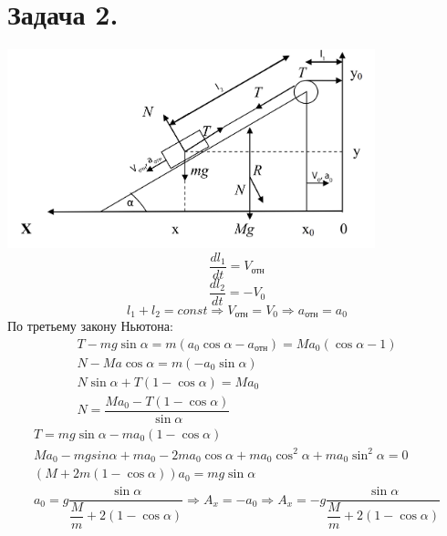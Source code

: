 \documentclass[12pt]{article}
\begin{document}
\begin{sloppypar}
    \section*{Задача 2.}
    \includegraphics[width=0.8\textwidth]{graphics/task_02.png}
    \[
        \dfrac{dl_1}{dt} = V_{\text{отн}}
    \]
    \[
        \dfrac{dl_2}{dt} = -V_0
    \]
    \[
        l_1 + l_2 = const \Rightarrow V_\text{отн} = V_0 \Rightarrow a_\text{отн} = a_0
    \]
    По третьему закону Ньютона:
    \[
        \begin{array}{l}
            T - mg\sin\alpha = m(a_0\cos\alpha - a_\text{отн}) = Ma_0(\cos\alpha - 1) \\
            N - Ma\cos\alpha = m(-a_0\sin\alpha)                                      \\
            N\sin\alpha + T(1 - \cos\alpha) = Ma_0                                    \\
            N = \dfrac{Ma_0 - T(1 - \cos\alpha)}{\sin\alpha}
        \end{array}
    \]
    \[
        \begin{array}{l}
            T = mg\sin\alpha - ma_0(1-\cos\alpha)                                                \\
            Ma_0 - mgsin\alpha + ma_0 - 2ma_0\cos\alpha + ma_0\cos^2\alpha +ma_0\sin^2\alpha = 0 \\
            (M + 2m(1- \cos\alpha))a_0 = mg\sin\alpha                                            \\
            a_0 = g\dfrac{\sin\alpha}{\dfrac{M}{m} + 2(1 - \cos\alpha)} \Rightarrow A_x = -a_0 \Rightarrow A_x = -g\dfrac{\sin\alpha}{\dfrac{M}{m} + 2(1 - \cos\alpha)}
        \end{array}
    \]



\end{sloppypar}
\end{document}
